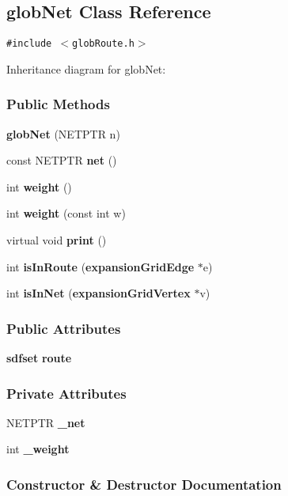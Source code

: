 \subsection{glob\-Net  Class Reference}
\label{globNet}
{\tt \#include $<$glob\-Route.h$>$}

Inheritance diagram for glob\-Net:\begin{figure}[H]
\begin{center}
\leavevmode
\setlength{\epsfysize}{2cm}
\end{center}
\end{figure}
\subsubsection*{Public Methods}
\begin{CompactItemize}
\item 
{\bf glob\-Net} (NETPTR n)
\item 
const NETPTR {\bf net} ()
\item 
int {\bf weight} ()
\item 
int {\bf weight} (const int w)
\item 
virtual void {\bf print} ()
\item 
int {\bf is\-In\-Route} ({\bf expansion\-Grid\-Edge} $\ast$e)
\item 
int {\bf is\-In\-Net} ({\bf expansion\-Grid\-Vertex} $\ast$v)
\end{CompactItemize}
\subsubsection*{Public Attributes}
\begin{CompactItemize}
\item 
{\bf sdfset} {\bf route}
\end{CompactItemize}
\subsubsection*{Private Attributes}
\begin{CompactItemize}
\item 
NETPTR {\bf \_\-net}
\item 
int {\bf \_\-weight}
\end{CompactItemize}


\subsubsection{Constructor \& Destructor Documentation}
\label{globNet_a0}
